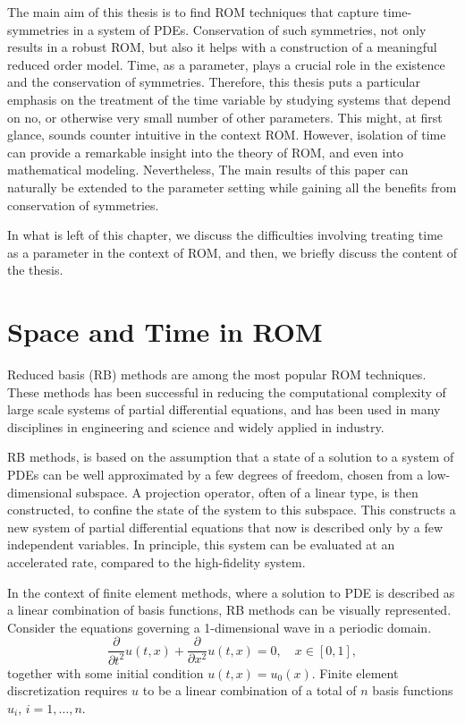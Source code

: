 The main aim of this thesis is to find ROM techniques that capture time-symmetries in a system of PDEs. Conservation of such symmetries, not only results in a robust ROM, but also it helps with a construction of a meaningful reduced order model. Time, as a parameter, plays a crucial role in the existence and the conservation of symmetries. Therefore, this thesis puts a particular emphasis on the treatment of the time variable by studying systems that depend on no, or otherwise very small number of other parameters. This might, at first glance, sounds counter intuitive in the context ROM. However, isolation of time can provide a remarkable insight into the theory of ROM, and even into mathematical modeling. Nevertheless, The main results of this paper can naturally be extended to the parameter setting while gaining all the benefits from conservation of symmetries.

In what is left of this chapter, we discuss the difficulties involving treating time as a parameter in the context of ROM, and then, we briefly discuss the content of the thesis.

\section{Space and Time in ROM}
Reduced basis (RB) methods are among the most popular ROM techniques. These methods has been successful in reducing the computational complexity of large scale systems of partial differential equations, and has been used in many disciplines in engineering and science and widely applied in industry. 

RB methods, is based on the assumption that a state of a solution to a system of PDEs can be well approximated by a few degrees of freedom, chosen from a low-dimensional subspace. A projection operator, often of a linear type, is then constructed, to confine the state of the system to this subspace. This constructs a new system of partial differential equations that now is described only by a few independent variables. In principle, this system can be evaluated at an accelerated rate, compared to the high-fidelity system.

In the context of finite element methods, where a solution to PDE is described as a linear combination of basis functions, RB methods can be visually represented. Consider the equations governing a 1-dimensional wave in a periodic domain.
\begin{equation}
	\frac{\partial }{\partial t^2} u(t,x) + \frac{\partial }{\partial x^2} u(t,x) = 0, \quad x\in[0,1],
\end{equation}
together with some initial condition $u(t,x) = u_0(x)$. Finite element discretization requires $u$ to be a linear combination of a total of $n$ basis functions $u_i$, $i=1,\dots,n$.
